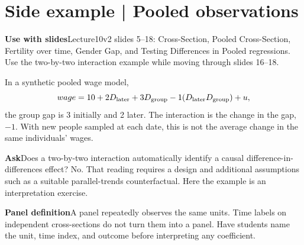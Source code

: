 \documentclass[11pt,a4paper]{article}
\newcommand{\heading}[1]{\section*{\color{accent}#1}}
\newcommand{\cue}[2]{\par\noindent\textbf{#1}\quad #2\par}
\begin{document}
\heading{Side example | Pooled observations}
\cue{Use with slides}{Lecture10v2 slides 5--18: Cross-Section, Pooled Cross-Section, Fertility over time, Gender Gap, and Testing Differences in Pooled regressions. Use the two-by-two interaction example while moving through slides 16--18.}
In a synthetic pooled wage model,
\[
wage=10+2D_{\rm later}+3D_{\rm group}
-1(D_{\rm later}D_{\rm group})+u,
\]
the group gap is 3 initially and 2 later. The interaction is the change in the gap, $-1$. With new people sampled at each date, this is not the average change in the same individuals' wages.
\cue{Ask}{Does a two-by-two interaction automatically identify a causal difference-in-differences effect? No. That reading requires a design and additional assumptions such as a suitable parallel-trends counterfactual. Here the example is an interpretation exercise.}
\cue{Panel definition}{A panel repeatedly observes the same units. Time labels on independent cross-sections do not turn them into a panel. Have students name the unit, time index, and outcome before interpreting any coefficient.}
\end{document}

